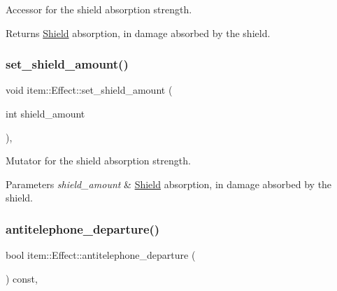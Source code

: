 Accessor for the shield absorption strength. 

\begin{DoxyReturn}{Returns}
\hyperlink{classitem_1_1_shield}{Shield} absorption, in damage absorbed by the shield. 
\end{DoxyReturn}
\mbox{\label{classitem_1_1_effect_a1610df003ab26e8ce4aafc5a13543e86}} 
\subsubsection{\texorpdfstring{set\+\_\+shield\+\_\+amount()}{set\_shield\_amount()}}
{\footnotesize\ttfamily void item\+::\+Effect\+::set\+\_\+shield\+\_\+amount (\begin{DoxyParamCaption}\item[{int}]{shield\+\_\+amount }\end{DoxyParamCaption})\hspace{0.3cm}{\ttfamily [inline]}, {\ttfamily [noexcept]}}



Mutator for the shield absorption strength. 


\begin{DoxyParams}{Parameters}
{\em shield\+\_\+amount} & \hyperlink{classitem_1_1_shield}{Shield} absorption, in damage absorbed by the shield. \\
\hline
\end{DoxyParams}
\mbox{\label{classitem_1_1_effect_abd1c6fcf2c430da628787c535cdeb527}} 
\subsubsection{\texorpdfstring{antitelephone\+\_\+departure()}{antitelephone\_departure()}}
{\footnotesize\ttfamily bool item\+::\+Effect\+::antitelephone\+\_\+departure (\begin{DoxyParamCaption}{ }\end{DoxyParamCaption}) const\hspace{0.3cm}{\ttfamily [inline]}, {\ttfamily [noexcept]}}



